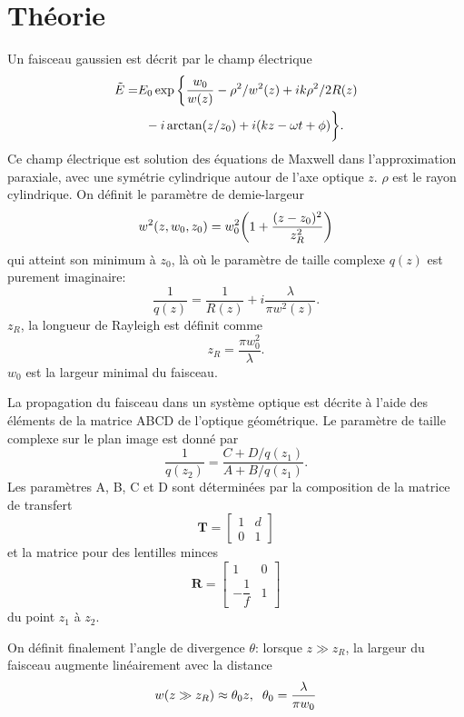 \documentclass[10pt,letterpaper,twocolumn]{article}
\DeclarePairedDelimiter\autobracket{(}{)}
\newcommand{\br}[1]{\autobracket*{#1}}
\begin{document}
\section{Théorie}\label{sec:theorie} %
Un faisceau gaussien est décrit par le champ électrique\supercite{Pedrotti}
\begin{align}
\nonumber	\tilde{E} = &E_0\exp\bigg\{\frac{w_0}{w(z)}-\rho^2/w^2(z)+ik\rho^2/2R(z) \\
									&\hspace{0.2cm}-i\arctan(z/z_0)+i(kz - \omega t + \phi)\bigg\}.
\end{align}
Ce champ électrique est solution des équations de Maxwell dans l'approximation paraxiale, avec une symétrie cylindrique autour de l'axe optique $z$. $\rho$ est le rayon cylindrique. On définit le paramètre de demie-largeur
\begin{equation}\label{eq:w}
	w^2(z, w_0, z_0) = w_0^2\br{1 + \frac{(z - z_0)^2}{z_R^2}}
\end{equation}
qui atteint son minimum à $z_0$, là où le paramètre de taille complexe $q(z)$ est purement imaginaire:
\begin{equation}\label{eq:q}
	\frac{1}{q(z)} = \frac{1}{R(z)} + i\frac{\lambda}{\pi w^2(z)}.
\end{equation}
$z_R$, la longueur de Rayleigh est définit comme
\begin{equation}
	z_R = \frac{\pi w_0^2}{\lambda}.
\end{equation}
$w_0$ est la largeur minimal du faisceau. \par
La propagation du faisceau dans un système optique est décrite à l'aide des éléments de la matrice ABCD de l'optique géométrique. Le paramètre de taille complexe sur le plan image est donné par\supercite{Collins1970}
\begin{equation}\label{eq:ABCD}
	\frac{1}{q(z_2)} = \frac{C + D/q(z_1)}{A + B/q(z_1)}.
\end{equation}
Les paramètres A, B, C et D sont déterminées par la composition de la matrice de transfert 
\begin{equation}
	\mathbf{T} = \left[\begin{matrix}
		1 & d\\
		0 & 1
	\end{matrix}    \right]
\end{equation}
et la matrice pour des lentilles minces
\begin{equation}
	\mathbf{R} = \left[ \begin{matrix}
		1 & 0 \\
		-\dfrac{1}{f} & 1
	\end{matrix}   \right]
\end{equation}
du point $z_1$ à $z_2$.\par
On définit finalement l'angle de divergence $\theta$: lorsque $z \gg z_R$, la largeur du faisceau augmente linéairement avec la distance
\begin{equation}\label{eq:theta}
	w(z\gg z_R) \approx \theta_0 z,\hspace{0.2cm} \theta_0 = \frac{\lambda }{\pi w_0}
\end{equation}
\par
\end{document}
